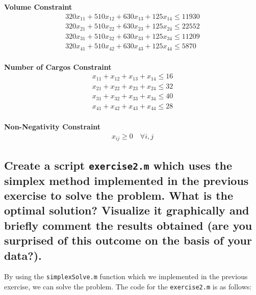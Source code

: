 \documentclass[unicode,11pt,a4paper,oneside,numbers=endperiod,openany]{scrartcl}
\begin{document}
\textbf{Volume Constraint}
\begin{equation}
	\begin{aligned}
		320x_{11} + 510x_{12} + 630x_{13} + 125x_{14} \leq 11930 \\
		320x_{21} + 510x_{22} + 630x_{23} + 125x_{24} \leq 22552 \\
		320x_{31} + 510x_{32} + 630x_{33} + 125x_{34} \leq 11209 \\
		320x_{41} + 510x_{42} + 630x_{43} + 125x_{44} \leq 5870  \\
	\end{aligned}
	\label{eq:2.1.3}
\end{equation}

\textbf{Number of Cargos Constraint}
\begin{equation}
	\begin{aligned}
		x_{11} + x_{12} + x_{13} + x_{14} \leq 16 \\
		x_{21} + x_{22} + x_{23} + x_{24} \leq 32 \\
		x_{31} + x_{32} + x_{33} + x_{34} \leq 40 \\
		x_{41} + x_{42} + x_{43} + x_{44} \leq 28 \\
	\end{aligned}
	\label{eq:2.1.4}
\end{equation}

\textbf{Non-Negativity Constraint}
\begin{equation}
	\begin{aligned}
		x_{ij} \geq 0 \quad \forall i, j
	\end{aligned}
	\label{eq:2.1.5}
\end{equation}

\subsection{Create a script \texttt{exercise2.m} which uses the simplex method implemented in the previous exercise to solve the problem. What is the optimal solution? Visualize it graphically and briefly comment the results obtained (are you surprised of this outcome on the basis of your data?).}

By using the \texttt{simplexSolve.m} function which we implemented in the previous exercise, we can solve the problem. The code for the \texttt{exercise2.m} is as follows:
\end{document}
